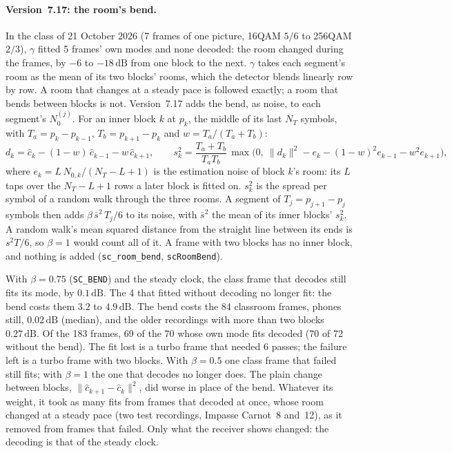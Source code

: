 \documentclass[11pt,a4paper]{article}
\newcommand{\dB}{\,\mathrm{dB}}
\newcommand{\code}[1]{\texttt{#1}}
\theoremstyle{remark}
\begin{document}
\paragraph{Version~7.17: the room's bend.} In the class of 21 October 2026 (7 frames of one picture, 16QAM $5/6$ to 256QAM $2/3$), $\gamma$ fitted 5 frames' own modes and none decoded: the room changed during the frames, by $-6$ to $-18\dB$ from one block to the next. $\gamma$ takes each segment's room as the mean of its two blocks' rooms, which the detector blends linearly row by row. A room that changes at a steady pace is followed exactly; a room that bends between blocks is not. Version~7.17 adds the bend, as noise, to each segment's $N_0^{(j)}$. For an inner block $k$ at $p_k$, the middle of its last $N_T$ symbols, with $T_a = p_k - p_{k-1}$, $T_b = p_{k+1} - p_k$ and $w = T_a/(T_a + T_b)$:
\begin{equation}
d_k = \hat c_k - (1 - w)\,\hat c_{k-1} - w\,\hat c_{k+1}, \qquad s_k^2 = \frac{T_a + T_b}{T_a T_b}\,\max\bigl(0,\ \|d_k\|^2 - e_k - (1 - w)^2 e_{k-1} - w^2 e_{k+1}\bigr),
\end{equation}
where $e_k = L\,N_{0,k}/(N_T - L + 1)$ is the estimation noise of block $k$'s room: its $L$ taps over the $N_T - L + 1$ rows a later block is fitted on. $s_k^2$ is the spread per symbol of a random walk through the three rooms. A segment of $T_j = p_{j+1} - p_j$ symbols then adds $\beta\,\bar s^2\,T_j/6$ to its noise, with $\bar s^2$ the mean of its inner blocks' $s_k^2$. A random walk's mean squared distance from the straight line between its ends is $s^2T/6$, so $\beta = 1$ would count all of it. A frame with two blocks has no inner block, and nothing is added (\code{sc\_room\_bend}, \code{scRoomBend}).

With $\beta = 0.75$ (\code{SC\_BEND}) and the steady clock, the class frame that decodes still fits its mode, by $0.1\dB$. The 4 that fitted without decoding no longer fit: the bend costs them $3.2$ to $4.9\dB$. The bend costs the 84 classroom frames, phones still, $0.02\dB$ (median), and the older recordings with more than two blocks $0.27\dB$. Of the 183 frames, 69 of the 70 whose own mode fits decoded (70 of 72 without the bend). The fit lost is a turbo frame that needed 6 passes; the failure left is a turbo frame with two blocks. With $\beta = 0.5$ one class frame that failed still fits; with $\beta = 1$ the one that decodes no longer does. The plain change between blocks, $\|\hat c_{k+1} - \hat c_k\|^2$, did worse in place of the bend. Whatever its weight, it took as many fits from frames that decoded at once, whose room changed at a steady pace (two test recordings, Impasse Carnot~8 and~12), as it removed from frames that failed. Only what the receiver shows changed: the decoding is that of the steady clock.
\end{document}

